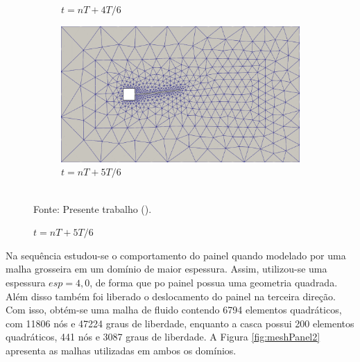 \begin{figure}[h!]
\begin{subfigure}[b]{0.49\textwidth}
        \caption{$t=nT+4T/6$}
    \end{subfigure}
    \begin{subfigure}[b]{0.49\textwidth}
        \includegraphics[width=\linewidth]{Figuras/FSI-prism2/mT6.png}
        \caption{$t=nT+5T/6$}
    \end{subfigure}
    \\Fonte: Presente trabalho (\the\year).
    \label{fig:prismMesh2}
\end{figure}
\newpage

Na sequência estudou-se o comportamento do painel quando modelado por uma malha grosseira em um domínio de maior espessura. Assim, utilizou-se uma espessura $esp=4,0$, de forma que po painel possua uma geometria quadrada. Além disso também foi liberado o deslocamento do painel na terceira direção. Com isso, obtém-se uma malha de fluido contendo 6794 elementos quadráticos, com 11806 nós e 47224 graus de liberdade, enquanto a casca possui 200 elementos quadráticos, 441 nós e 3087 graus de liberdade. A Figura \ref{fig:meshPanel2} apresenta as malhas utilizadas em ambos os domínios.

